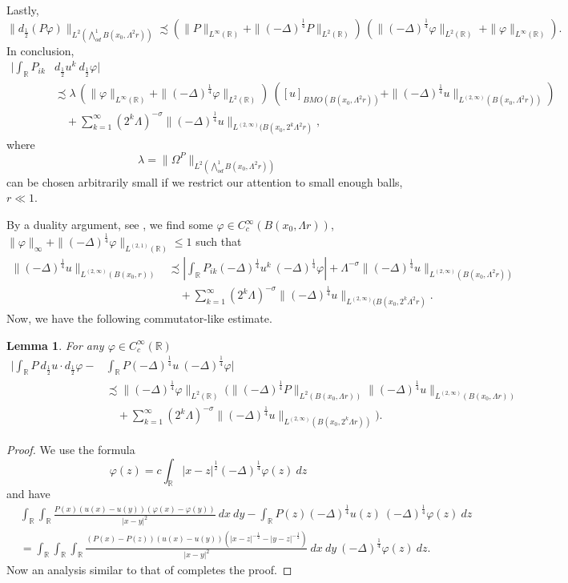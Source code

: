 \documentclass[12pt]{amsart}
\newtheorem{lemma}[theorem]{Lemma}
\theoremstyle{definition}
\newcommand{\R}{\mathbb{R}}
\newcommand{\brac}[1]{\left (#1 \right )}
\newcommand{\Ep}{\bigwedge\nolimits}
\numberwithin{theorem}{section} \numberwithin{equation}{section}
\newcommand{\lap}{\Delta }
\newcommand{\aleq}{\precsim}
\newcommand{\lapv}{(-\lap)^{\frac{1}{4}}}
\begin{document}
Lastly,
\[
 \|d_{\frac{1}{2}}\brac{P \varphi}\|_{L^2(\Ep^1_{od} B(x_0,\Lambda^2 r))} \aleq \brac{\|P\|_{L^\infty(\R)} + \|\lapv P\|_{L^2(\R)}}\, \brac{\|\lapv \varphi\|_{L^2(\R)}\ +  \|\varphi\|_{L^\infty(\R)}}. 
\]
In conclusion,
\[
\begin{split}
\bigg |\int_{\R} P_{ik} &d_{\frac{1}{2}} u^k\ d_{\frac{1}{2}} \varphi \bigg | \\
&\aleq \lambda\,  (\|\varphi\|_{L^\infty(\R)} + \|\lapv \varphi\|_{L^2(\R)})\ 
\brac{[u]_{BMO(B(x_0,\Lambda^2 r))} + \|\lapv u\|_{L^{(2,\infty)}(B(x_0,\Lambda^2 r))}}\\
&\quad+ \sum_{k=1}^\infty (2^k \Lambda)^{-\sigma} \|\lapv u\|_{L^{(2,\infty)}(B(x_0,2^k \Lambda^2 r)},
\end{split}
  \]
where
\[
 \lambda = \|\Omega^P\|_{L^2(\Ep^1_{od} B(x_0,\Lambda^2 r))}
\]
can be chosen arbitrarily small if we restrict our attention to small enough balls, $r \ll 1$.

By a duality argument, see \cite[Lemma 5.18]{Schikorra-eps}, we find some $\varphi \in C_c^\infty(B(x_0,\Lambda r))$, $\|\varphi \|_{\infty} + \|\lapv \varphi\|_{L^{(2,1)}(\R)} \leq 1$ such that 
\[
\begin{split}
 \|\lapv u\|_{L^{(2,\infty)}(B(x_0,r))} &\aleq \left |\int_{\R} P_{ik} \lapv u^k\ \lapv \varphi \right | + \Lambda^{-\sigma} \|\lapv u\|_{L^{(2,\infty)}(B(x_0,\Lambda^2 r))} \\
 & \quad + \sum_{k=1}^\infty (2^k \Lambda)^{-\sigma} \|\lapv u\|_{L^{(2,\infty)}(B(x_0,2^k \Lambda^2 r)}.
 \end{split}
\]
% 
Now, we have the following commutator-like estimate.
\begin{lemma}
For any $\varphi \in C_c^\infty(\R)$
\[
\begin{split}
 \bigg |\int_{\R} P\ d_{\frac{1}{2}} u\cdot d_{\frac{1}{2}} \varphi -& \int_{\R} P\lapv u\ \lapv \varphi \bigg |\\  &\aleq \|\lapv \varphi\|_{L^2(\R)}\ \bigg(\|\lapv P\|_{L^{2}(B(x_0,\Lambda r))} \|\lapv u\|_{L^{(2,\infty)}(B(x_0,\Lambda r))} \\
 &\quad+ \sum_{k=1}^\infty (2^k \Lambda)^{-\sigma} \|\lapv u\|_{L^{(2,\infty)}(B(x_0,2^k \Lambda r))}\bigg).
 \end{split}
\]
\end{lemma}
\begin{proof}
We use the formula\[
        \varphi(z) = c\int_{\R} |x-z|^{\frac{1}{2}} \lapv \varphi(z)\ dz
       \]
and have
 \[
\begin{split}
 &\int_{\R} \int_{\R} \frac{P(x)(u(x)-u(y))(\varphi(x)-\varphi(y))}{|x-y|^2}\ dx\ dy - \int_{\R} P(z)\lapv u(z)\ \lapv \varphi(z)\ dz\\
&= \int_{\R} \int_{\R} \int_{\R} \frac{(P(x)-P(z))(u(x)-u(y))  \brac{|x-z|^{-\frac12}-|y-z|^{-\frac12}}}{|x-y|^2}\ dx\ dy\ \lapv \varphi(z)\ dz.
\end{split}
 \]
Now an analysis similar to that of \cite[Lemma 6.5, Lemma 6.6.]{Schikorra-CPDE} completes the proof. 
\end{proof}
\end{document}
